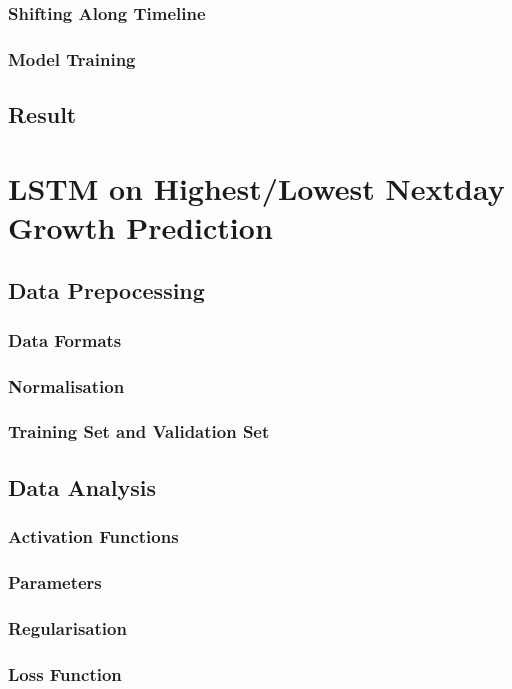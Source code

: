 \documentclass[11pt]{article} %
\theoremstyle{plain}
\theoremstyle{definition}
\begin{document}
\subsubsection{Shifting Along Timeline}
\subsubsection{Model Training}
\subsection{Result}

\clearpage

\section{LSTM on Highest/Lowest Nextday Growth Prediction}
\subsection{Data Prepocessing}
\subsubsection{Data Formats}
\subsubsection{Normalisation}
\subsubsection{Training Set and Validation Set}
\subsection{Data Analysis}
\subsubsection{Activation Functions}
\subsubsection{Parameters}
\subsubsection{Regularisation}
\subsubsection{Loss Function}
\end{document}
